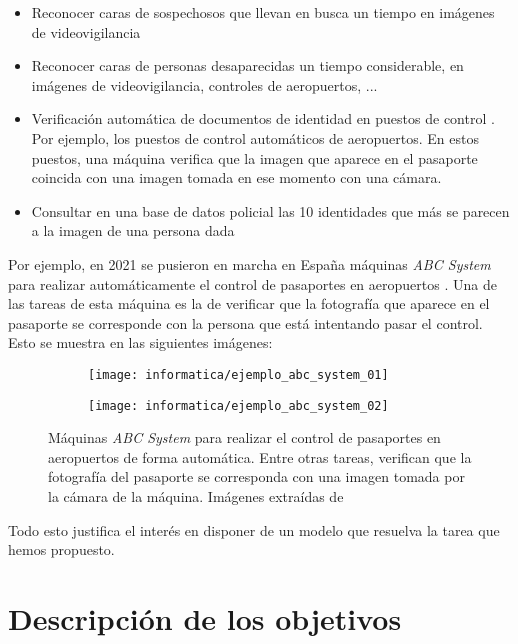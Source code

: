 \begin{itemize}
    \item Reconocer caras de sospechosos que llevan en busca un tiempo en imágenes de videovigilancia
    \item Reconocer caras de personas desaparecidas un tiempo considerable, en imágenes de videovigilancia, controles de aeropuertos, ...
    \item Verificación automática de documentos de identidad en puestos de control \cite{informatica:tecnica_sintesis_aifr}. Por ejemplo, los puestos de control automáticos de aeropuertos. En estos puestos, una máquina verifica que la imagen que aparece en el pasaporte coincida con una imagen tomada en ese momento con una cámara.
    \item Consultar en una base de datos policial las 10 identidades que más se parecen a la imagen de una persona dada
\end{itemize}

Por ejemplo, en 2021 se pusieron en marcha en España máquinas \textit{ABC System} para realizar automáticamente el control de pasaportes en aeropuertos \cite{informatica:articulo_abc_system}. Una de las tareas de esta máquina es la de verificar que la fotografía que aparece en el pasaporte se corresponde con la persona que está intentando pasar el control. Esto se muestra en las siguientes imágenes:

\begin{figure}[H]
    \centering
    \begin{subfigure}{0.4\textwidth}
        \texttt{[image: informatica/ejemplo\_abc\_system\_01]}
    \end{subfigure}
    \begin{subfigure}{0.4\textwidth}
        \texttt{[image: informatica/ejemplo\_abc\_system\_02]}
    \end{subfigure}

    \caption{Máquinas \textit{ABC System} para realizar el control de pasaportes en aeropuertos de forma automática. Entre otras tareas, verifican que la fotografía del pasaporte se corresponda con una imagen tomada por la cámara de la máquina. Imágenes extraídas de \cite{informatica:articulo_abc_system}}
\end{figure}

Todo esto justifica el interés en disponer de un modelo que resuelva la tarea que hemos propuesto.

\section{Descripción de los objetivos}

